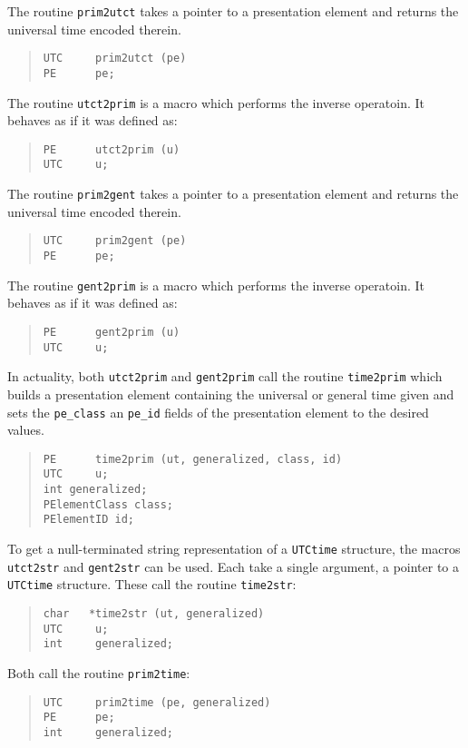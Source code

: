 The routine \verb"prim2utct" takes a pointer to a presentation element and
returns the universal time encoded therein.
\begin{quote}\small\begin{verbatim}
UTC     prim2utct (pe)
PE      pe;
\end{verbatim}
\end{quote}
The routine \verb"utct2prim" is a macro which performs the inverse operatoin.
It behaves as if it was defined as:
\begin{quote}\small\begin{verbatim}
PE      utct2prim (u)
UTC     u;
\end{verbatim}\end{quote}

The routine \verb"prim2gent" takes a pointer to a presentation element and
returns the universal time encoded therein.
\begin{quote}\small\begin{verbatim}
UTC     prim2gent (pe)
PE      pe;
\end{verbatim}
\end{quote}
The routine \verb"gent2prim" is a macro which performs the inverse operatoin.
It behaves as if it was defined as:
\begin{quote}\small\begin{verbatim}
PE      gent2prim (u)
UTC     u;
\end{verbatim}\end{quote}

In actuality,
both \verb"utct2prim" and \verb"gent2prim" call the routine \verb"time2prim"
which builds a
presentation element containing the universal or general time given and sets
the \verb"pe_class" an \verb"pe_id" fields of the presentation element to the
desired values.
\begin{quote}\small\begin{verbatim}
PE      time2prim (ut, generalized, class, id)
UTC     u;
int	generalized;
PElementClass class;
PElementID id;
\end{verbatim}\end{quote}

To get a null-terminated string representation of a \verb"UTCtime" structure,
the macros \verb"utct2str" and \verb"gent2str" can be
used.
Each take a single argument, a pointer to a \verb"UTCtime" structure.
These call the routine \verb"time2str":
\begin{quote}\small\begin{verbatim}
char   *time2str (ut, generalized)
UTC     u;
int     generalized;
\end{verbatim}\end{quote}
Both call the routine \verb"prim2time":
\begin{quote}\small\begin{verbatim}
UTC     prim2time (pe, generalized)
PE      pe;
int     generalized;
\end{verbatim}\end{quote}


